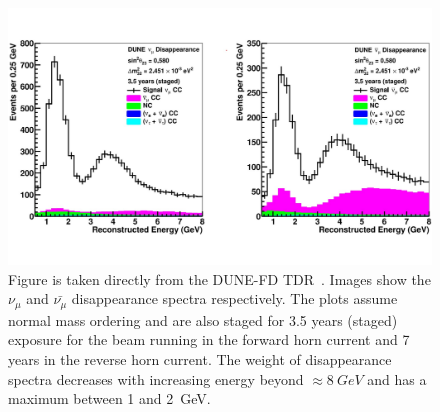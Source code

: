 \begin{figure}[]
\centering
\includegraphics[width=\textwidth]{images/tdr_muon_reconstruction_tdrv2.pdf}
\caption{Figure is taken directly from the DUNE-FD TDR~\citep{DUNE_FD_TDRv2_2020}.
Images show the $\nu_{\mu}$ and $\bar{\nu_{\mu}}$ disappearance spectra respectively.
The plots assume normal mass ordering and are also staged for 3.5 years (staged) exposure for the beam running in the forward horn current and 7 years in the reverse horn current.
The weight of disappearance spectra decreases with increasing energy beyond $\approx 8~\unit{GeV}$ and has a maximum between 1 and 2~\unit{GeV}.
}
\end{figure}~\label{fig:muon_interaction}

